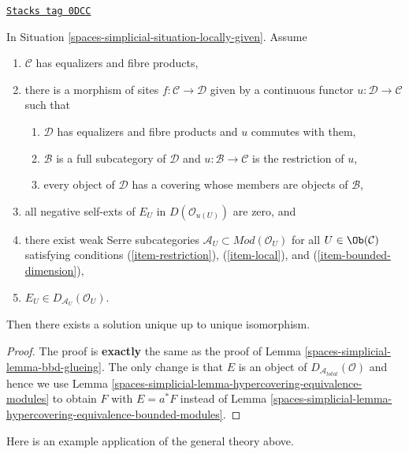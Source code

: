 \begin{lemma}

\label{spaces-simplicial-lemma-bbd-unbounded-glueing}
\href{https://stacks.math.columbia.edu/tag/0DCC}{\texttt{Stacks tag 0DCC}}

In Situation \ref{spaces-simplicial-situation-locally-given}. Assume
\begin{enumerate}
\item $\mathcal{C}$ has equalizers and fibre products,
\item there is a morphism of sites $f : \mathcal{C} \to \mathcal{D}$
given by a continuous functor $u : \mathcal{D} \to \mathcal{C}$
such that
\begin{enumerate}
\item $\mathcal{D}$ has equalizers and fibre products and $u$
commutes with them,
\item $\mathcal{B}$ is a full subcategory of $\mathcal{D}$
and $u : \mathcal{B} \to \mathcal{C}$ is the restriction of $u$,
\item every object of $\mathcal{D}$ has a covering whose members
are objects of $\mathcal{B}$,
\end{enumerate}
\item all negative self-exts of $E_U$ in $D(\mathcal{O}_{u(U)})$ are zero, and
\item there exist weak Serre subcategories
$\mathcal{A}_U \subset \textit{Mod}(\mathcal{O}_U)$ for all
$U \in \Ob(\mathcal{C})$ satisfying conditions (\ref{item-restriction}),
(\ref{item-local}), and (\ref{item-bounded-dimension}),
\item $E_U \in D_{\mathcal{A}_U}(\mathcal{O}_U)$.
\end{enumerate}
Then there exists a solution unique up to unique isomorphism.
\end{lemma}

\begin{proof}
The proof is {\bf exactly} the same as the proof of
Lemma \ref{spaces-simplicial-lemma-bbd-glueing}. The only change is that
$E$ is an object of $D_{\mathcal{A}_{total}}(\mathcal{O})$
and hence we use Lemma \ref{spaces-simplicial-lemma-hypercovering-equivalence-modules}
to obtain $F$ with $E = a^*F$
instead of Lemma \ref{spaces-simplicial-lemma-hypercovering-equivalence-bounded-modules}.
\end{proof}

Here is an example application of the general theory above.


